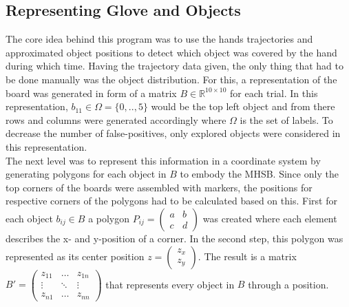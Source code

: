 \subsection{Representing Glove and Objects}
The core idea behind this program was to use the hands trajectories and approximated object positions to detect which object was covered by the hand during which time. Having the trajectory data given, the only thing that had to be done manually was the object distribution. For this, a representation of the board was generated in form of a matrix $B \in \mathbb{R}^{10 \times 10}$ for each trial. In this representation, $b_{11} \in \Omega=\{0,..,5\}$ would be the top left object and from there rows and columns were generated accordingly where $\Omega$ is the set of labels. To decrease the number of false-positives, only explored objects were considered in this representation.\\
The next level was to represent this information in a coordinate system by generating polygons for each object in $ B $ to embody the MHSB. Since only the top corners of the boards were assembled with markers, the positions for respective corners of the polygons had to be calculated based on this. First for each object $ b_{ij} \in B $ a polygon $ P_{ij} = \begin{pmatrix}a & b \\ c & d\end{pmatrix} $ was created where each element describes the x- and y-position of a corner. In the second step, this polygon was represented as its center position $ z = \begin{pmatrix}
z_{x} \\ z_{y}
\end{pmatrix}$. The result is a matrix $B' = \begin{pmatrix}
z_{11} & \hdots & z_{1n} \\
\vdots & \ddots & \vdots \\
z_{n1} & \hdots & z_{nn}
\end{pmatrix}$
that represents every object in $ B $ through a position.\\
\\
